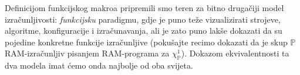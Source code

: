 Definicijom funkcijskog makroa pripremili smo teren za bitno drugačiji model iz\-ra\-čun\-lji\-vo\-sti: \emph{funkcijsku} paradigmu, gdje je puno teže vizualizirati strojeve, algoritme, konfiguracije i izračunavanja, ali je zato puno lakše dokazati da su pojedine konkretne funkcije izračunljive (pokušajte recimo dokazati da je skup $\mathbb P$ RAM-izračunljiv pisanjem RAM-programa za $\chi_{\mathbb P}^1$). Dokazom ekvivalentnosti ta dva modela imat ćemo onda najbolje od oba svijeta.